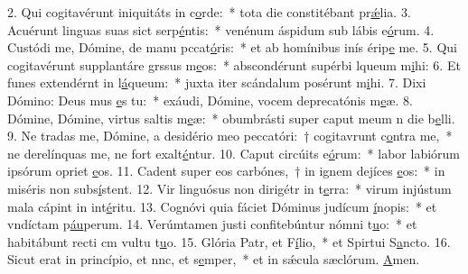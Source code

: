 2. Qui cogitavérunt iniquitáts in c\uline{o}rde:~* tota die constitébant pr\uline{ǽ}lia.
3. Acuérunt linguas suas sict serp\uline{é}ntis:~* venénum áspidum sub lábis e\uline{ó}rum.
4. Custódi me, Dómine, de manu pccat\uline{ó}ris:~* et ab homínibus inís érip\uline{e} me.
5. Qui cogitavérunt supplantáre grssus m\uline{e}os:~* abscondérunt supérbi lqueum m\uline{i}hi:
6. Et funes extendérnt in l\uline{á}queum:~* juxta iter scándalum posérunt m\uline{i}hi.
7. Dixi Dómino: Deus mus \uline{e}s tu:~* exáudi, Dómine, vocem deprecatónis m\uline{e}æ.
8. Dómine, Dómine, virtus saltis m\uline{e}æ:~* obumbrásti super caput meum n die b\uline{e}lli.
9. Ne tradas me, Dómine, a desidério meo peccatóri:~† cogitavrunt c\uline{o}ntra me,~* ne derelínquas me, ne fort exalt\uline{é}ntur.
10. Caput circúits e\uline{ó}rum:~* labor labiórum ipsórum opriet \uline{e}os.
11. Cadent super eos carbónes,~† in ignem dejíces \uline{e}os:~* in miséris non subs\uline{í}stent.
12. Vir linguósus non dirigétr in t\uline{e}rra:~* virum injústum mala cápint in int\uline{é}ritu.
13. Cognóvi quia fáciet Dóminus judícum \uline{í}nopis:~* et vndíctam p\uline{áu}perum.
14. Verúmtamen justi confitebúntur nómni t\uline{u}o:~* et habitábunt recti cm vultu t\uline{u}o.
15. Glória Patr, et F\uline{í}lio,~* et Spirtui S\uline{a}ncto.
16. Sicut erat in princípio, et nnc, et s\uline{e}mper,~* et in sǽcula sæclórum. \uline{A}men.
